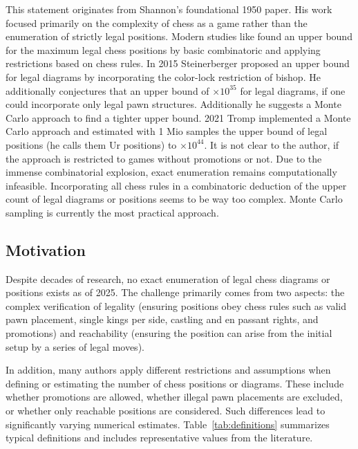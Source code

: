 \documentclass[12pt]{article}
\begin{document}
This statement originates from Shannon’s foundational 1950 paper. His work focused primarily on the complexity of chess as a game rather than the enumeration of strictly legal positions. 
Modern studies like \cite{chinchalker1996} found an upper bound for the maximum legal chess positions by basic combinatoric and applying restrictions based on chess rules. In 2015 Steinerberger \cite{steinnerberger2015} proposed an upper bound for legal diagrams by incorporating the color-lock restriction of bishop. He additionally conjectures that an upper bound of $\times10^{35}$ for legal diagrams, if one could incorporate only legal pawn structures. Additionally he suggests a Monte Carlo approach to find a tighter upper bound.
2021 Tromp \cite{tromp2021b} implemented a Monte Carlo approach and estimated with 1 Mio samples the upper bound of legal positions (he calls them Ur positions) to $\times10^{44}$. It is not clear to the author, if the approach is restricted to games without promotions or not. 
Due to the immense combinatorial explosion, exact enumeration remains computationally infeasible. Incorporating all chess rules in a combinatoric deduction of the upper count of legal diagrams or positions seems to be way too complex. Monte Carlo sampling is currently the most practical approach.

\subsection{Motivation}

Despite decades of research, no exact enumeration of legal chess diagrams or positions exists as of 2025. 
The challenge primarily comes from two aspects: the complex verification of legality 
(ensuring positions obey chess rules such as valid pawn placement, single kings per side, 
castling and en passant rights, and promotions) and reachability 
(ensuring the position can arise from the initial setup by a series of legal moves). 

In addition, many authors apply different restrictions and assumptions when defining or estimating 
the number of chess positions or diagrams. These include whether promotions are allowed, whether illegal pawn 
placements are excluded, or whether only reachable positions are considered. Such differences lead 
to significantly varying numerical estimates. Table~\ref{tab:definitions} summarizes typical definitions 
and includes representative values from the literature.
\end{document}
